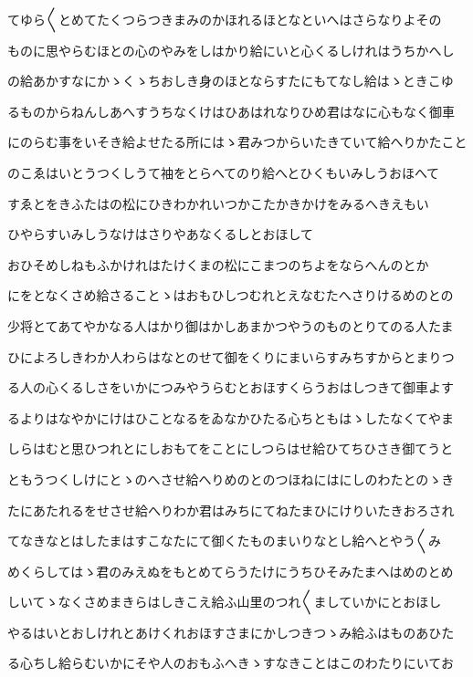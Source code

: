 \documentclass[a4paper,11pt,landscape]{ltjtarticle}
\begin{document}
てゆら〱とめてたくつらつきまみのかほれるほとなといへはさらなりよその
\par\medskip
ものに思やらむほとの心のやみをしはかり給にいと心くるしけれはうちかへし
\par\medskip
の給あかすなにかゝくゝちおしき身のほとならすたにもてなし給はゝときこゆ
\par\medskip
るものからねんしあへすうちなくけはひあはれなりひめ君はなに心もなく御車
\par\medskip
にのらむ事をいそき給よせたる所にはゝ君みつからいたきていて給へりかたこと
\par\medskip
のこゑはいとうつくしうて袖をとらへてのり給へとひくもいみしうおほへて
\par\medskip
すゑとをきふたはの松にひきわかれいつかこたかきかけをみるへきえもい
\par\medskip
ひやらすいみしうなけはさりやあなくるしとおほして
\par\medskip
おひそめしねもふかけれはたけくまの松にこまつのちよをならへんのとか
\par\medskip
にをとなくさめ給さることゝはおもひしつむれとえなむたへさりけるめのとの
\par\medskip
少将とてあてやかなる人はかり御はかしあまかつやうのものとりてのる人たま
\par\medskip
ひによろしきわか人わらはなとのせて御をくりにまいらすみちすからとまりつ
\par\medskip
る人の心くるしさをいかにつみやうらむとおほすくらうおはしつきて御車よす
\par\medskip
るよりはなやかにけはひことなるをゐなかひたる心ちともはゝしたなくてやま
\par\medskip
しらはむと思ひつれとにしおもてをことにしつらはせ給ひてちひさき御てうと
\par\medskip
ともうつくしけにとゝのへさせ給へりめのとのつほねにはにしのわたとのゝき
\par\medskip
たにあたれるをせさせ給へりわか君はみちにてねたまひにけりいたきおろされ
\par\medskip
てなきなとはしたまはすこなたにて御くたものまいりなとし給へとやう〱み
\par\medskip
めくらしてはゝ君のみえぬをもとめてらうたけにうちひそみたまへはめのとめ
\par\medskip
しいてゝなくさめまきらはしきこえ給ふ山里のつれ〱ましていかにとおほし
\par\medskip
やるはいとおしけれとあけくれおほすさまにかしつきつゝみ給ふはものあひた
\par\medskip
る心ちし給らむいかにそや人のおもふへきゝすなきことはこのわたりにいてお
\end{document}
